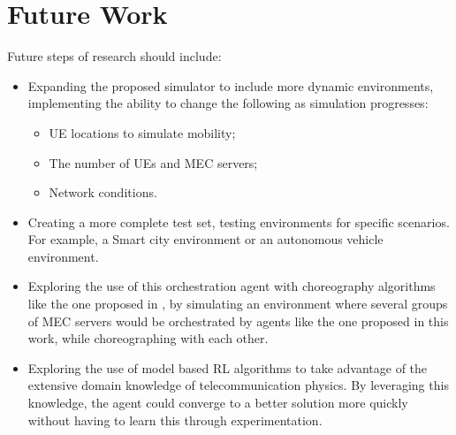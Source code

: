 \section{Future Work}
\noindent Future steps of research should include:
\begin{itemize}
    \item Expanding the proposed simulator to include more dynamic environments, implementing the ability to change the following as simulation progresses:
    \begin{itemize}
      \item \acrshort{UE} locations to simulate mobility;
      \item The number of \acrshort{UE}s and \acrshort{MEC} servers;
      \item Network conditions.
    \end{itemize}
    \item Creating a more complete test set, testing environments for specific scenarios. For example, a Smart city environment or an autonomous vehicle environment. 
    \item Exploring the use of this orchestration agent with choreography algorithms like the one proposed in \cite{Lulu}, by simulating an environment where several groups of \acrshort{MEC} servers would be orchestrated by agents like the one proposed in this work, while choreographing with each other.
    \item Exploring the use of model based \acrshort{RL} algorithms to take advantage of the extensive domain knowledge of telecommunication physics. By leveraging this knowledge, the agent could converge to a better solution more quickly without having to learn this through experimentation.
\end{itemize}